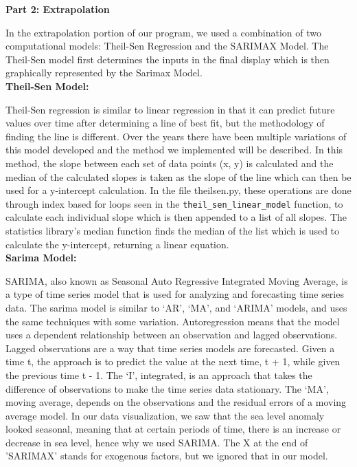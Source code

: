 \documentclass[fontsize=11pt]{article}
\begin{document}
    \textbf{Part 2: Extrapolation}

    \hspace{\parindent}In the extrapolation portion of our program, we used a combination of two computational models: Theil-Sen Regression and the SARIMAX Model. The Theil-Sen model first determines the inputs in the final display which is then graphically represented by the Sarimax Model. \\

    \textbf{Theil-Sen Model:}

    Theil-Sen regression is similar to linear regression in that it can predict future values over time after determining a line of best fit, but the methodology of finding the line is different. Over the years there have been multiple variations of this model developed and the method we implemented will be described. In this method, the slope between each set of data points (x, y) is calculated and the median of the calculated slopes is taken as the slope of the line which can then be used for a y-intercept calculation. In the file theilsen.py, these operations are done through index based for loops seen in the \texttt{theil\_sen\_linear\_model} function, to calculate each individual slope which is then appended to a list of all slopes. The statistics library’s median function finds the median of the list which is used to calculate the y-intercept, returning a linear equation. \\

    \textbf{Sarima Model:}

    \hspace{\parindent}SARIMA, also known as Seasonal Auto Regressive Integrated Moving Average, is a type of time series model that is used for analyzing and forecasting time series data. The sarima model is similar to ‘AR’, ‘MA’, and ‘ARIMA’ models, and uses the same techniques with some variation. Autoregression means that the model uses a dependent relationship between an observation and lagged observations. Lagged observations are a way that time series models are forecasted. Given a time t, the approach is to predict the value at the next time, t + 1, while given the previous time t - 1. The ‘I’, integrated, is an approach that takes the difference of observations to make the time series data stationary. The ‘MA’, moving average, depends on the observations and the residual errors of a moving average model. In our data visualization, we saw that the sea level anomaly looked seasonal, meaning that at certain periods of time, there is an increase or decrease in sea level, hence why we used SARIMA. The X at the end of 'SARIMAX' stands for exogenous factors, but we ignored that in our model. \\
\end{document}

